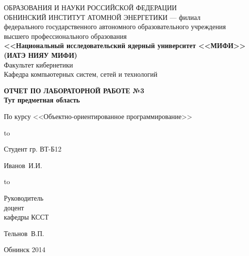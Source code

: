 
\begin{titlepage}
\newpage

\begin{center}
{\small{} ОБРАЗОВАНИЯ И НАУКИ РОССИЙСКОЙ ФЕДЕРАЦИИ\\
ОБНИНСКИЙ ИНСТИТУТ АТОМНОЙ ЭНЕРГЕТИКИ --- филиал}\\
федерального государственного автономного образовательного учреждения\\
высшего профессионального образования\\
{\bf<<Национальный исследовательский ядерный университет <<МИФИ>>\\
(ИАТЭ НИЯУ МИФИ)}\\
\vspace{2em}
Факультет кибернетики\\
Кафедра компьютерных систем, сетей и технологий
\end{center}
\vspace{2em}


\vspace{5em}
\begin{center}
\textbf{ОТЧЕТ ПО ЛАБОРАТОРНОЙ РАБОТЕ №3\\ Тут предметная область}
\end{center}


\begin{center}
По курсу <<Объектно-ориентированное программирование>>
\end{center}

\vspace{6em}

\hbox to \textwidth
{\parbox{6 cm}{Студент гр. ВТ-Б12}\dotfill \parbox{4 cm}{
\begin{flushright}Иванов~И.И.\end{flushright}}}
\vspace{2em}

\hbox to \textwidth
{\parbox{6 cm}{Руководитель\\доцент\\ кафедры КССТ}\dotfill \parbox{4 cm}{
\begin{flushright}Тельнов~В.П.\end{flushright}}}
\vspace{2em}



\vspace{\fill}

\begin{center}
Обнинск 2014
\end{center}

\end{titlepage}